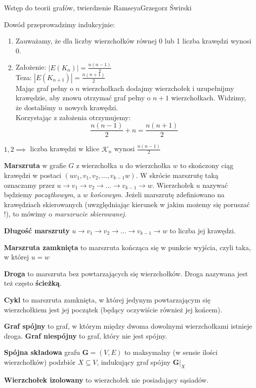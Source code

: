 \begin{referat}{Wstęp do teorii grafów, twierdzenie Ramseya}{Grzegorz Świrski}
\begin{teoria}
\begin{dowod}
Dowód przeprowadzimy indukcyjnie:
\begin{enumerate}
 \item Zauważamy, że dla liczby wierzchołków równej 0 lub 1 liczba krawędzi wynosi 0.
 \item Założenie: $|E(K_{n})| = \frac{n(n-1)}{2}$\\
 Teza: $|E(K_{n+1})| = \frac{n(n+1)}{2}$\\
 Mając graf pełny o $n$ wierzchołkach dodajmy wierzchołek i uzupełnijmy krawędzie, aby znowu otrzymać graf pełny o $n+1$ wierzchołkach. Widzimy, że dostaliśmy $n$ nowych krawędzi.\\
 Korzystając z założenia otrzymujemy:
 $$ \frac{n(n-1)}{2} + n = \frac{n(n+1)}{2} $$
\end{enumerate}
$1, 2 \implies$ liczba krawędzi w klice $\mathcal{K}_{n}$ wynosi $\frac{n(n-1)}{2}$
\end{dowod}

\textbf{Marszruta} w grafie $G$ z wierzchołka $u$ do wierzchołka $w$ to skończony ciąg krawędzi w postaci $(uv_1, v_1,v_2,\ldots,v_{k-1}w)$. W skrócie marszrutę taką oznaczamy przez $u\to v_1\to v_2\to\ldots\to v_{k-1}\to w$. Wierzchołek $u$ nazywać będziemy \emph{początkowym}, a $w$ \emph{końcowym}. Jeżeli marszrutę zdefiniowano na krawędziach skierowanych (uwzględniając kierunek w jakim możemy się poruszać !), to mówimy o \emph{marszrucie skierowanej}.

\textbf{Długość marszruty} $u\to v_1\to v_2\to\ldots\to v_{k-1}\to w$
to liczba jej krawędzi.

\textbf{Marszruta zamknięta} to marszruta kończąca się w punkcie wyjścia, 
czyli taka, w której $u=w$

\textbf{Droga} to marszruta bez powtarzających się wierzchołków. Droga nazywana jest też często \textbf{ścieżką}.

\textbf{Cykl} to marszruta zamknięta, w której jedynym powtarzającym się wierzchołkiem jest jej początek (będący oczywiście również jej końcem).

\textbf{Graf spójny} to graf, w którym między dwoma dowolnymi wierzchołkami istnieje droga. \textbf{Graf niespójny} to graf, który nie jest spójny.

\textbf{Spójna składowa} grafu $\mathbf{G}=\left(V,E\right)$
to maksymalny (w sensie ilości wierzchołków) podzbiór $X\subseteq V$,
indukujący graf spójny $\mathbf{G}|_X$

\textbf{Wierzchołek izolowany} to wierzchołek nie posiadający sąsiadów.


\end{teoria}
\end{referat}
